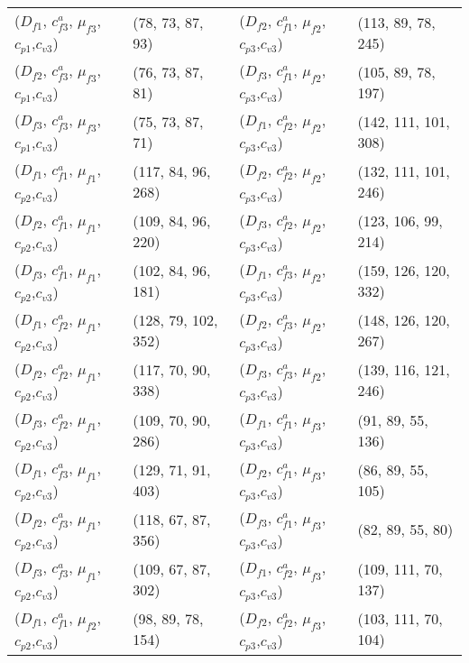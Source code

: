 \documentclass[preprint,12pt]{elsarticle}
\begin{document}
\begin{appendices}
\begin{table}[htbp]
\begin{tabular}{llll}
    ($D_{f1}$, $c^{a}_{f3}$, $\mu_{f3}$, $c_{p1}$,$c_{v3}$) & (78, 73, 87, 93) & ($D_{f2}$, $c^{a}_{f1}$, $\mu_{f2}$, $c_{p3}$,$c_{v3}$) & (113, 89, 78, 245) \\
    ($D_{f2}$, $c^{a}_{f3}$, $\mu_{f3}$, $c_{p1}$,$c_{v3}$) & (76, 73, 87, 81) & ($D_{f3}$, $c^{a}_{f1}$, $\mu_{f2}$, $c_{p3}$,$c_{v3}$) & (105, 89, 78, 197) \\
    ($D_{f3}$, $c^{a}_{f3}$, $\mu_{f3}$, $c_{p1}$,$c_{v3}$) & (75, 73, 87, 71) & ($D_{f1}$, $c^{a}_{f2}$, $\mu_{f2}$, $c_{p3}$,$c_{v3}$) & (142, 111, 101, 308) \\
    ($D_{f1}$, $c^{a}_{f1}$, $\mu_{f1}$, $c_{p2}$,$c_{v3}$) & (117, 84, 96, 268) & ($D_{f2}$, $c^{a}_{f2}$, $\mu_{f2}$, $c_{p3}$,$c_{v3}$) & (132, 111, 101, 246) \\
    ($D_{f2}$, $c^{a}_{f1}$, $\mu_{f1}$, $c_{p2}$,$c_{v3}$) & (109, 84, 96, 220) & ($D_{f3}$, $c^{a}_{f2}$, $\mu_{f2}$, $c_{p3}$,$c_{v3}$) & (123, 106, 99, 214) \\
    ($D_{f3}$, $c^{a}_{f1}$, $\mu_{f1}$, $c_{p2}$,$c_{v3}$) & (102, 84, 96, 181) & ($D_{f1}$, $c^{a}_{f3}$, $\mu_{f2}$, $c_{p3}$,$c_{v3}$) & (159, 126, 120, 332) \\
    ($D_{f1}$, $c^{a}_{f2}$, $\mu_{f1}$, $c_{p2}$,$c_{v3}$) & (128, 79, 102, 352) & ($D_{f2}$, $c^{a}_{f3}$, $\mu_{f2}$, $c_{p3}$,$c_{v3}$) & (148, 126, 120, 267) \\
    ($D_{f2}$, $c^{a}_{f2}$, $\mu_{f1}$, $c_{p2}$,$c_{v3}$) & (117, 70, 90, 338) & ($D_{f3}$, $c^{a}_{f3}$, $\mu_{f2}$, $c_{p3}$,$c_{v3}$) & (139, 116, 121, 246) \\
    ($D_{f3}$, $c^{a}_{f2}$, $\mu_{f1}$, $c_{p2}$,$c_{v3}$) & (109, 70, 90, 286) & ($D_{f1}$, $c^{a}_{f1}$, $\mu_{f3}$, $c_{p3}$,$c_{v3}$) & (91, 89, 55, 136) \\
    ($D_{f1}$, $c^{a}_{f3}$, $\mu_{f1}$, $c_{p2}$,$c_{v3}$) & (129, 71, 91, 403) & ($D_{f2}$, $c^{a}_{f1}$, $\mu_{f3}$, $c_{p3}$,$c_{v3}$) & (86, 89, 55, 105) \\
    ($D_{f2}$, $c^{a}_{f3}$, $\mu_{f1}$, $c_{p2}$,$c_{v3}$) & (118, 67, 87, 356) & ($D_{f3}$, $c^{a}_{f1}$, $\mu_{f3}$, $c_{p3}$,$c_{v3}$) & (82, 89, 55, 80) \\
    ($D_{f3}$, $c^{a}_{f3}$, $\mu_{f1}$, $c_{p2}$,$c_{v3}$) & (109, 67, 87, 302) & ($D_{f1}$, $c^{a}_{f2}$, $\mu_{f3}$, $c_{p3}$,$c_{v3}$) & (109, 111, 70, 137) \\
    ($D_{f1}$, $c^{a}_{f1}$, $\mu_{f2}$, $c_{p2}$,$c_{v3}$) & (98, 89, 78, 154) & ($D_{f2}$, $c^{a}_{f2}$, $\mu_{f3}$, $c_{p3}$,$c_{v3}$) & (103, 111, 70, 104) \\

\end{tabular}
\end{table}
\end{appendices}
\end{document}
